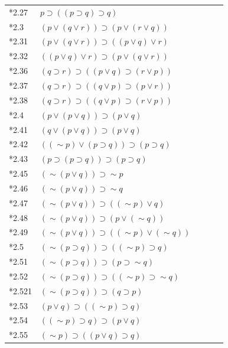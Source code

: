 \documentclass[journal]{IEEEtran}
\begin{document}
\begin{table}[h]
\begin{tabular}{lllll}
*2.27 & $p \supset ((p \supset q) \supset q) $ & \Y & \ & \Y \\
*2.3 & $(p \vee (q \vee r)) \supset (p \vee (r \vee q)) $ & \Y & \ & \Y \\
*2.31 & $(p \vee (q \vee r)) \supset ((p \vee q) \vee r) $ & \N & \N \cite[p.~220]{LT1957} & \N \\
*2.32 & $((p \vee q) \vee r) \supset (p \vee (q \vee r)) $ & \N & \ & \N \\
*2.36 & $(q \supset r) \supset ((p \vee q) \supset (r \vee p)) $ & \N & \ & \N \\
*2.37 & $(q \supset r) \supset ((q \vee p) \supset (p \vee r)) $ & \N & \ & \N \\
*2.38 & $(q \supset r) \supset ((q \vee p) \supset (r \vee p)) $ & \Y & \ & \N \\
*2.4 & $(p \vee (p \vee q)) \supset (p \vee q) $ & \N & \ & \N \\
*2.41 & $(q \vee (p \vee q)) \supset (p \vee q) $ & \N & \ & \N \\
*2.42 & $(( \sim p) \vee (p \supset q)) \supset (p \supset q) $ & \Y & \ & \N \\
*2.43 & $(p \supset (p \supset q)) \supset (p \supset q) $ & \Y & \ & \Y \\
*2.45 & $ (\sim (p \vee q)) \supset \sim p $ & \Y & \Y \cite[p.~219]{LT1957} & \Y \\
*2.46 & $ (\sim (p \vee q)) \supset \sim q $ & \Y & \ & \Y \\
*2.47 & $ (\sim (p \vee q)) \supset ( (\sim p) \vee q) $ & \Y & \ & \Y \\
*2.48 & $ (\sim (p \vee q)) \supset (p \vee (\sim q)) $ & \Y & \Y \cite[p.~229]{LT1957} & \Y \\
*2.49 & $ (\sim (p \vee q)) \supset ( (\sim p) \vee (\sim q)) $ & \Y & \ & \Y \\
*2.5 & $ (\sim (p \supset q)) \supset ( (\sim p) \supset q) $ & \Y & \ & \Y \\
*2.51 & $ (\sim (p \supset q)) \supset (p \supset \sim q) $ & \Y & \ & \Y \\
*2.52 & $ (\sim (p \supset q)) \supset ( (\sim p) \supset \sim q)$ & \Y & \ & \Y \\
*2.521 & $ (\sim (p \supset q)) \supset (q \supset p) $ & \Y & \ & \Y \\
*2.53 & $(p \vee q) \supset ( (\sim p) \supset q) $ & \Y & \ & \N \\
*2.54 & $( (\sim p )\supset q) \supset (p \vee q) $ & \Y & \ & \N \\
*2.55 & $ (\sim p) \supset ((p \vee q) \supset q) $ & \Y & \ & \Y \\

\end{tabular}
\end{table}
\end{document}
